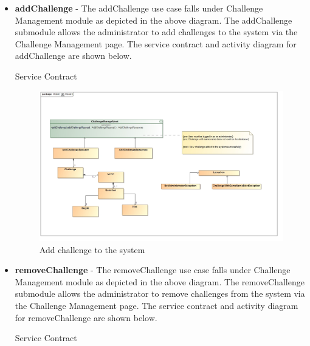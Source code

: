 \documentclass[english]{article}
\begin{document}
		\begin{itemize}
			\item \textbf{addChallenge} -  The addChallenge use case falls under Challenge Management module as depicted in the above diagram.  The addChallenge submodule allows the administrator to add challenges to the system via the Challenge Management page. The service contract and activity diagram for addChallenge are shown below.
			\begin{center}
				Service Contract
			\end{center}
			
			\begin{figure}[H]
				\begin{center}
					\includegraphics[scale=0.25]{AddChallengeContract.jpg}
				\end{center}
				\caption{Add challenge to the system}
				
			\end{figure}
			
			
		 \item \textbf{removeChallenge} -  The removeChallenge use case falls under Challenge Management module as depicted in the above diagram.  The removeChallenge submodule allows the administrator to remove challenges from the system via the Challenge Management page. The service contract and activity diagram for removeChallenge are shown below.
			\newpage
		 	\begin{center}
		 		Service Contract
		 	\end{center}
		 	

\end{itemize}
\end{document}
